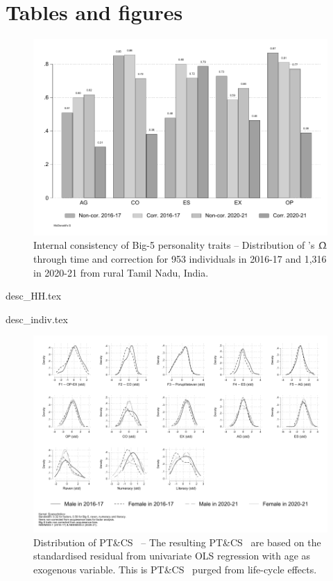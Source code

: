 \documentclass[a4paper, 12pt, onecolumn]{article}
\newcommand{\PTCS}{PT\&CS}
\begin{document}
\clearpage
\newpage
\section*{Tables and figures}

\begin{figure}[!h]
\raggedright
\includegraphics[scale=0.8]{INPUT/omega}
\caption{Internal consistency of Big-5 personality traits -- Distribution of \citeauthor{McDonald1999}'s $\Upomega$ through time and correction for 953 individuals in 2016-17 and 1,316 in 2020-21 from rural Tamil Nadu, India.}
\label{fig:omega}
\end{figure}

{desc_HH.tex}

{desc_indiv.tex}

\begin{figure}[!h]
\raggedright
\includegraphics[width=\textwidth]{INPUT/Kernel_PTCS_raw_new}
\caption{Distribution of \PTCS~ -- The resulting \PTCS~ are based on the standardised residual from univariate OLS regression with age as exogenous variable. This is \PTCS~ purged from life-cycle effects.}
\label{fig:PTCS}
\end{figure}
\end{document}
